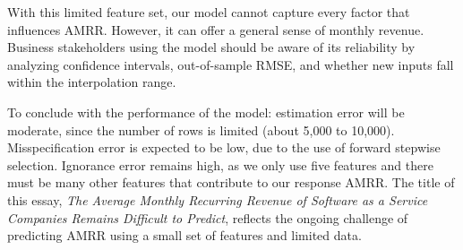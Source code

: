 \documentclass[12pt]{article}
\begin{document}
With this limited feature set, our model cannot capture every factor that influences AMRR. However, it can offer a general sense of monthly revenue. Business stakeholders using the model should be aware of its reliability by analyzing confidence intervals, out-of-sample RMSE, and whether new inputs fall within the interpolation range.

To conclude with the performance of the model: estimation error will be moderate, since the number of rows is limited (about 5,000 to 10,000). Misspecification error is expected to be low, due to the use of forward stepwise selection. Ignorance error remains high, as we only use five features and there must be many other features that contribute to our response AMRR. The title of this essay, \textit{The Average Monthly Recurring Revenue of Software as a Service Companies Remains Difficult to Predict}, reflects the ongoing challenge of predicting AMRR using a small set of features and limited data.
\end{document}
